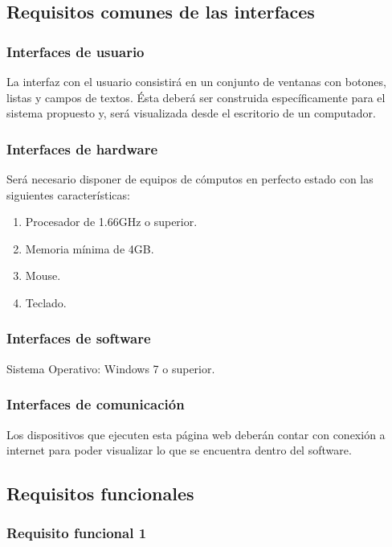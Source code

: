 \documentclass[11pt]{article}
\begin{document}
\subsection{\textbf{Requisitos comunes de las interfaces}}

\subsubsection{Interfaces de usuario}
La interfaz con el usuario consistirá en un conjunto de ventanas con
botones, listas y campos de textos. Ésta deberá ser construida
específicamente para el sistema propuesto y, será visualizada desde 
el escritorio de un computador.

\subsubsection{Interfaces de hardware}

Será necesario disponer de equipos de cómputos en perfecto estado
con las siguientes características:

\begin{enumerate}
\item Procesador de 1.66GHz o superior.
\item Memoria mínima de 4GB.
\item Mouse.
\item Teclado.
\end{enumerate}


\subsubsection{Interfaces de software}
Sistema Operativo: Windows 7 o superior.


\subsubsection{Interfaces de comunicación}
Los dispositivos que ejecuten esta página web deberán contar con 
conexión a internet para poder visualizar lo que se encuentra dentro 
del software.

\subsection{\textbf{Requisitos funcionales}}

\subsubsection{Requisito funcional 1}
\end{document}
